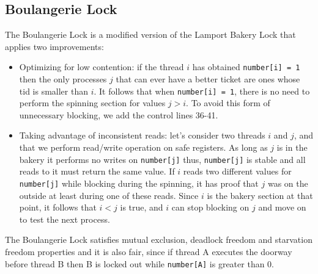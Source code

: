 \subsection{Boulangerie Lock}
The Boulangerie Lock \cite{MOSES201846} is a modified version of the Lamport Bakery Lock that applies two improvements:
\begin{itemize}
	\item Optimizing for low contention: if the thread $i$ has obtained \texttt{number[i] = 1} then the only processes $j$ that can ever have a better ticket are ones whose tid is smaller than $i$. It follows that when \texttt{number[i] = 1}, there is no need to perform the spinning section for values $j > i$. To avoid this form of unnecessary blocking, we add the control lines 36-41.

	\item Taking advantage of inconsistent reads: let's consider two threads $i$ and $j$, and that we perform read/write operation on safe registers. As long as $j$ is in the bakery it performs no writes on \texttt{number[j]} thus, \texttt{number[j]} is stable and all reads to it must return the same value. If $i$ reads two different values for \texttt{number[j]} while blocking during the spinning, it has proof that $j$ was on the outside at least during one of these reads. Since $i$ is the bakery section at that point, it follows that $i < j$ is true, and $i$ can stop blocking on $j$ and move on to test the next process.
\end{itemize}

The Boulangerie Lock satisfies mutual exclusion, deadlock freedom and starvation freedom properties and it is also fair, since if thread A executes the doorway before thread B then B is locked out while \texttt{number[A]} is greater than 0.


